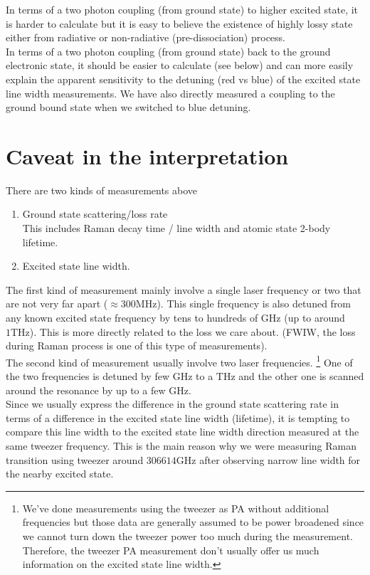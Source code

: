 \documentclass[10pt,fleqn]{article}
\begin{document}
In terms of a two photon coupling (from ground state) to higher excited state,
it is harder to calculate but it is easy to believe the existence of highly lossy
state either from radiative or non-radiative (pre-dissociation) process.\\

In terms of a two photon coupling (from ground state) back to the ground electronic state,
it should be easier to calculate (see below) and can more easily explain the apparent
sensitivity to the detuning (red vs blue) of the excited state line width measurements.
We have also directly measured a coupling to the ground bound state when we switched
to blue detuning.

\section{Caveat in the interpretation}

There are two kinds of measurements above
\begin{enumerate}
\item Ground state scattering/loss rate\\
  This includes Raman decay time / line width and atomic state 2-body lifetime.
\item Excited state line width.
\end{enumerate}

The first kind of measurement mainly involve a single laser frequency
or two that are not very far apart ($\approx 300 \mathrm{MHz}$).
This single frequency is also detuned from any known excited state frequency
by tens to hundreds of GHz (up to around $1 \mathrm{THz}$).
This is more directly related to the loss we care about.
(FWIW, the loss during Raman process is one of this type of measurements).\\

The second kind of measurement usually involve two laser frequencies.
\footnote{We've done measurements using the tweezer as PA without additional frequencies but
  those data are generally assumed to be power broadened since we cannot turn down the
  tweezer power too much during the measurement. Therefore, the tweezer PA measurement
  don't usually offer us much information on the excited state line width.}
One of the two frequencies is detuned by few GHz to a THz and the other one is scanned
around the resonance by up to a few GHz.\\

Since we usually express the difference in the ground state scattering rate in terms of
a difference in the excited state line width (lifetime), it is tempting to compare this
line width to the excited state line width direction measured at the same tweezer
frequency. This is the main reason why we were measuring Raman transition using
tweezer around $306614 \mathrm{GHz}$ after observing narrow line width for the nearby
excited state.\\
\end{document}
